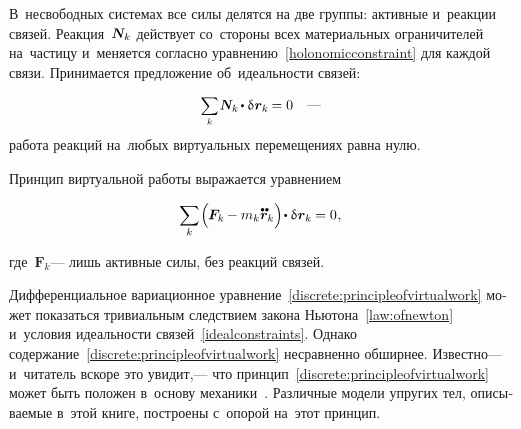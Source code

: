 \begin{otherlanguage}{russian}
В~несвободных системах все силы делятся на две группы: активные и~реакции связей.
Реакция~$\mathboldN_k$ действует со~стороны всех материальных ограничителей на~частицу  и~меняется согласно уравнению~\eqref{holonomicconstraint} для каждой связи.
Принимается предложение об~идеальности связей:

\nopagebreak\begin{equation}\label{idealconstraints}
\scalebox{0.9}{$\displaystyle \sum_k$} \hspace{.2ex} \mathboldN_k \hspace{-0.2ex} \dotp \variation{\hspace{.1ex}\locationvector_k} \hspace{-0.16ex} = 0
\quad \textrm{---}
\vspace{-0.25em}\end{equation}
\noindent работа реакций на~любых виртуальных перемещениях равна нулю.

Принцип виртуальной работы выражается уравнением

\nopagebreak\vspace{-0.1em}\begin{equation}\label{discrete:principleofvirtualwork}
\displaystyle \sum_{\smash{k}} \hspace{-0.2ex} \left(^{\mathstrut} \hspace{-0.25ex} \bm{F}_k \hspace{-0.12ex} - m_k \mathdotdotabove{\locationvector}_k \right) \hspace{-0.32ex} \dotp \variation{\hspace{.1ex}\locationvector_k} \hspace{-0.1ex} = 0 \hspace{0.1ex},
\vspace{-0.32em}\end{equation}

\noindent где~${\bm{F}_k}$\:--- лишь активные силы, без реакций связей.

Дифференциальное вариационное уравнение~\eqref{discrete:principleofvirtualwork} может показаться тривиальным следствием закона Ньютона~\eqref{law:ofnewton} и~условия идеальности связей~\eqref{idealconstraints}. Однако содержание~\eqref{discrete:principleofvirtualwork} несравненно обширнее. Известно\:--- и~читатель вскоре это увидит,\:--- что принцип~\eqref{discrete:principleofvirtualwork} может быть положен в~основу механики~\cite{gantmacher}. Различные модели упругих тел, описываемые в~этой книге, построены с~опорой на~этот принцип.


\end{otherlanguage}
